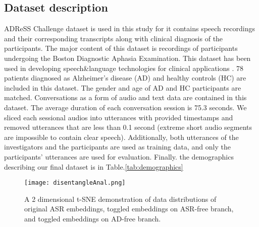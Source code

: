 \documentclass[lettersize,journal]{IEEEtran}
\begin{document}
\subsection{Dataset description}
ADReSS Challenge dataset \cite{luz2020alzheimer} is used in this study for it contains speech recordings and their corresponding transcripts along with clinical diagnosis of the participants. The major content of this dataset is recordings of participants undergoing the Boston Diagnostic Aphasia Examination. This dataset has been used in developing speech\&language technologies for clinical applications \cite{ilias2023detecting,wang2022conformer,li2022gpt,farzana2022you}.
78 patients diagnosed as Alzheimer's disease (AD) and healthy controls (HC) are included in this dataset. The gender and age of AD and HC participants are matched. Conversations as a form of audio and text data are contained in this dataset. The average duration of each conversation session is 75.3 seconds. We sliced each sessional audios into utterances with provided timestamps and removed utterances that are less than 0.1 second (extreme short audio segments are impossible to contain clear speech). Additionally, both utterances of the investigators and the participants are used as training data, and only the participants' utterances are used for evaluation. Finally. the demographics describing our final dataset is in Table.\ref{tab:demographics}

\begin{figure}
\centerline{\texttt{[image: disentangleAnal.png]}}
\caption{A 2 dimensional t-SNE demonstration of data distributions of original ASR embeddings, toggled embeddings on ASR-free branch, and toggled embeddings on AD-free branch.}
\label{fig:tsneDistrib}
\end{figure}
\end{document}

